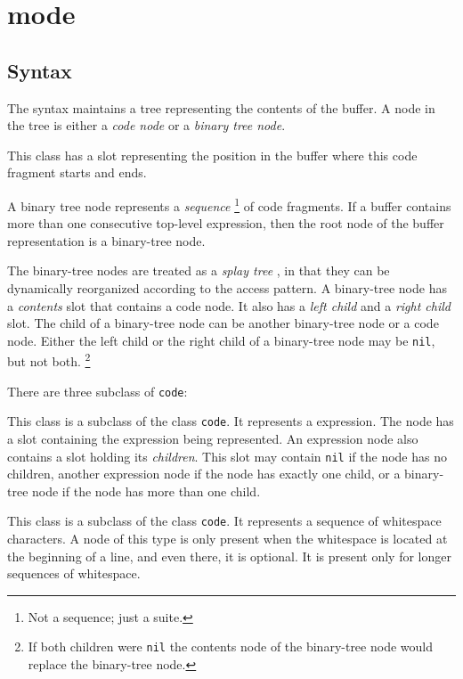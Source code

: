 \chapter{\commonlisp{} mode}
\label{chap-internals-common-lisp-mode}

\section{Syntax}

The \commonlisp{} syntax maintains a tree representing the contents of
the buffer.  A node in the tree is either a \emph{code node} or
a \emph{binary tree node}.


This class has a slot representing the position in the buffer where
this code fragment starts and ends.


A binary tree node represents a \emph{sequence}%
\footnote{Not a \commonlisp{} sequence; just a suite.}  of code
fragments.  If a buffer contains more than one consecutive top-level
expression, then the root node of the buffer representation is a
binary-tree node.

The binary-tree nodes are treated as a \emph{splay tree}
\cite{Sleator:1985:SBS:3828.3835}, in that they can be dynamically
reorganized according to the access pattern.  A binary-tree node has a
\emph{contents} slot that contains a code node.  It also has a
\emph{left child} and a \emph{right child} slot.  The child of a
binary-tree node can be another binary-tree node or a code node.
Either the left child or the right child of a binary-tree node may be
\texttt{nil}, but not both.%
\footnote{If both children were \texttt{nil} the contents node of the
  binary-tree node would replace the binary-tree node.}

There are three subclass of \texttt{code}:


This class is a subclass of the class \texttt{code}.  It represents a
\commonlisp{} expression.  The node has a slot containing the
expression being represented.  An expression node also
contains a slot holding its \emph{children}.  This slot may contain
\texttt{nil} if the node has no children, another expression node if
the node has exactly one child, or a binary-tree node if the node has
more than one child.


This class is a subclass of the class \texttt{code}.  It represents a
sequence of whitespace characters.  A node of this type is only
present when the whitespace is located at the beginning of a line, and
even there, it is optional.  It is present only for longer sequences
of whitespace.

